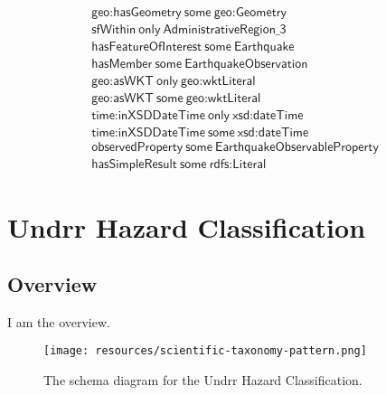 \begin{align}
  \textsf{geo:hasGeometry}~\textsf{some}~\textsf{geo:Geometry}\\
  \textsf{sfWithin}~\textsf{only}~\textsf{AdministrativeRegion\_3}\\
  \textsf{hasFeatureOfInterest}~\textsf{some}~\textsf{Earthquake}\\
  \textsf{hasMember}~\textsf{some}~\textsf{EarthquakeObservation}\\
  \textsf{geo:asWKT}~\textsf{only}~\textsf{geo:wktLiteral}\\
  \textsf{geo:asWKT}~\textsf{some}~\textsf{geo:wktLiteral}\\
  \textsf{time:inXSDDateTime}~\textsf{only}~\textsf{xsd:dateTime}\\
  \textsf{time:inXSDDateTime}~\textsf{some}~\textsf{xsd:dateTime}\\
  \textsf{observedProperty}~\textsf{some}~\textsf{EarthquakeObservableProperty}\\
  \textsf{hasSimpleResult}~\textsf{some}~\textsf{rdfs:Literal}\end{align}



\section{Undrr Hazard Classification}
\label{sec:undrr-hazard-classification}
\subsection{Overview}
\label{ssec:overview}

I am the overview.

\begin{figure}[h!]
  \begin{center}
    \texttt{[image: resources/scientific-taxonomy-pattern.png]}
  \end{center}
  \caption{The schema diagram for the Undrr Hazard Classification.}
  \label{fig:ov-diagram}
\end{figure}


